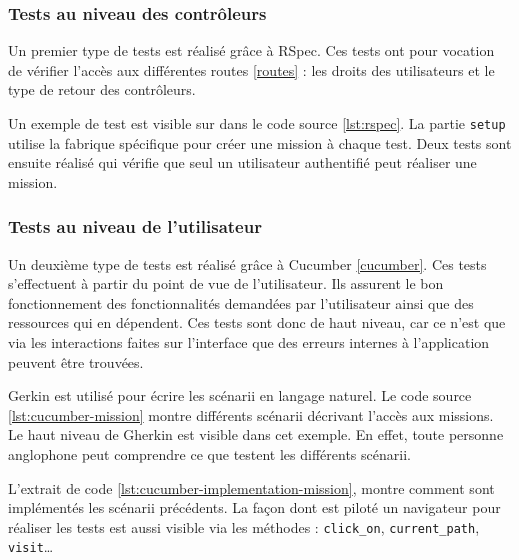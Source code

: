 \subsubsection{Tests au niveau des contrôleurs}
Un premier type de tests est réalisé grâce à RSpec. Ces tests ont pour vocation de vérifier l'accès aux différentes routes \ref{routes} : les droits des utilisateurs et le type de retour des contrôleurs.

Un exemple de test est visible sur dans le code source \ref{lst:rspec}. La partie \texttt{setup} utilise la fabrique spécifique pour créer une mission à chaque test. Deux tests sont ensuite réalisé qui vérifie que seul un utilisateur authentifié peut réaliser une mission.



\subsubsection{Tests au niveau de l'utilisateur}
Un deuxième type de tests est réalisé grâce à Cucumber \ref{cucumber}. Ces tests s'effectuent à partir du point de vue de l'utilisateur. Ils assurent le bon fonctionnement des fonctionnalités demandées par l'utilisateur ainsi que des ressources qui en dépendent. Ces tests sont donc de haut niveau, car ce n'est que via les interactions faites sur l'interface que des erreurs internes à l'application peuvent être trouvées.





Gerkin est utilisé pour écrire les scénarii en langage naturel. 
Le code source \ref{lst:cucumber-mission} montre différents scénarii décrivant l'accès aux missions. Le haut niveau de Gherkin est visible dans cet exemple. En effet, toute personne anglophone peut comprendre ce que testent les différents scénarii. 

L'extrait de code \ref{lst:cucumber-implementation-mission}, montre comment sont implémentés les scénarii précédents. La façon dont est piloté un navigateur pour réaliser les tests est aussi visible via les méthodes : \texttt{click\_on}, \texttt{current\_path}, \texttt{visit}\ldots

